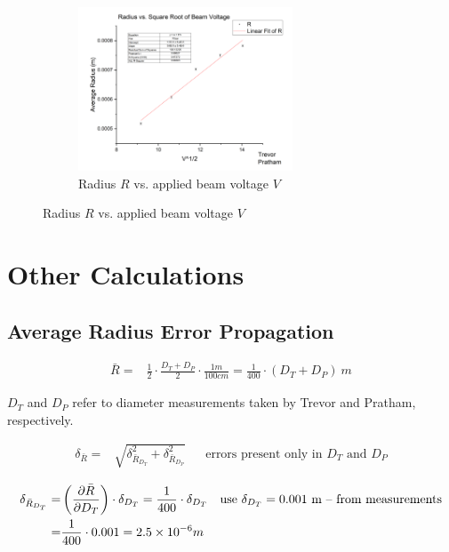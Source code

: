 \documentclass[12pt]{article}
\begin{document}
\begin{figure} [h]
    \begin{subfigure}
        \centering
        \includegraphics[width=0.7\textwidth]{figures/EOM_Fix_Amps.png}
        \caption{Radius $R$ vs. applied beam voltage $V$}
        \label{f:FixA}
    \end{subfigure}
\end{figure}

\clearpage

\section{Other Calculations}
\subsection{Average Radius Error Propagation} \label{sec:RadiusErr}

\begin{align}
	\bar{R} =& \frac{1}{2}\cdot\frac{D_T + D_P}{2}\cdot\frac{1 m}{100 cm} = \frac{1}{400}\cdot(D_T + D_P)\ m \label{e:R_calculation} 	
\end{align}

$D_T$ and $D_P$ refer to diameter measurements taken by Trevor and Pratham, respectively.

\begin{align}
	\delta_{\bar{R}} =& \sqrt{\delta_{\bar{R}_{D_T}}^2 + \delta_{\bar{R}_{D_P}}^2} && \text{errors present only in }D_T \text{ and }D_P \label{e:R_bar_err_exp}
\end{align}

\begin{align}
	\delta_{\bar{R}_{D_T}} =& \left( \frac{\partial \bar{R}}{\partial D_T} \right)\cdot\delta_{D_T} = \frac{1}{400}\cdot\delta_{D_T} && \text{use }\delta_{D_T}=0.001\text{ m -- from measurements} \label{e:R_err_Dt} \\
	=& \frac{1}{400}\cdot0.001=2.5\times10^{-6} m \notag
\end{align}
\end{document}
